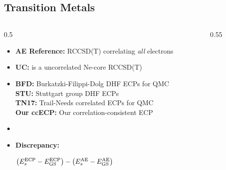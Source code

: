 \subsection{Transition Metals}
\begin{frame}
    \begin{columns}
	\begin{column}
	    {0.5\textwidth}
	    \begin{itemize}
		\footnotesize
	        \item[] {\bf AE Reference:} RCCSD(T) correlating {\em all} electrons\\
		\item[] {\color[HTML]{E41A1C} \bf UC:} is a uncorrelated Ne-core RCCSD(T)  \\
		\item[] {\color[HTML]{377EB8} \bf BFD:} Burkatzki-Filippi-Dolg DHF ECPs for QMC\\
		        {\color[HTML]{4DAF4A} \bf  STU:} Stuttgart group DHF ECPs\\
			{\color[HTML]{984EA3} \bf TN17:} Trail-Needs correlated ECPs for QMC \\
			{\color[HTML]{FF7F00} \bf Our ccECP:} Our correlation-consistent ECP
		\item[]
		\item[] {\color{wolfred} \bf Discrepancy:} \\
		    \begin{tcolorbox}[enhanced,drop lifted shadow,boxrule=.1pt,colback=blue!15,width=0.75\textwidth]
			    \centering
	        	    $\left(E_{s}^{\rm ECP}-E_{\rm GS}^{\rm ECP}\right) - \left( E_{s}^{\rm AE} - E_{\rm GS}^{\rm AE} \right) $
	        	\end{tcolorbox}
	    \end{itemize}
	\end{column}
	\begin{column}
	    {0.55\textwidth}
\end{column}
\end{columns}
\end{frame}
